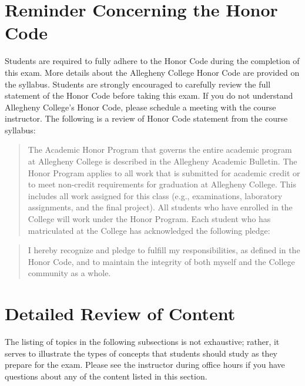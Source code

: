 \documentclass[11pt]{article}
\begin{document}
\section*{Reminder Concerning the Honor Code}

Students are required to fully adhere to the Honor Code during the completion of
this exam. More details about the Allegheny College Honor Code are provided on
the syllabus. Students are strongly encouraged to carefully review the full
statement of the Honor Code before taking this exam. If you do not understand
Allegheny College's Honor Code, please schedule a meeting with the course
instructor. The following is a review of Honor Code statement from the course
syllabus:

\vspace*{-.05in}

\begin{quote}
The Academic Honor Program that governs the entire academic program at
Allegheny College is described in the Allegheny Academic Bulletin. The Honor
Program applies to all work that is submitted for academic credit or to meet
non-credit requirements for graduation at Allegheny College. This includes all
work assigned for this class (e.g., examinations, laboratory assignments, and
the final project). All students who have enrolled in the College will work
under the Honor Program.  Each student who has matriculated at the College has
acknowledged the following pledge:
\end{quote}

\vspace*{-.1in}

\begin{quote}
%
  I hereby recognize and pledge to fulfill my responsibilities, as defined in
  the Honor Code, and to maintain the integrity of both myself and the College
  community as a whole.
%
\end{quote}

\section*{Detailed Review of Content}

The listing of topics in the following subsections is not exhaustive; rather, it
serves to illustrate the types of concepts that students should study as they
prepare for the exam. Please see the instructor during office hours if you have
questions about any of the content listed in this section.

\vspace*{-.1in}
\end{document}
